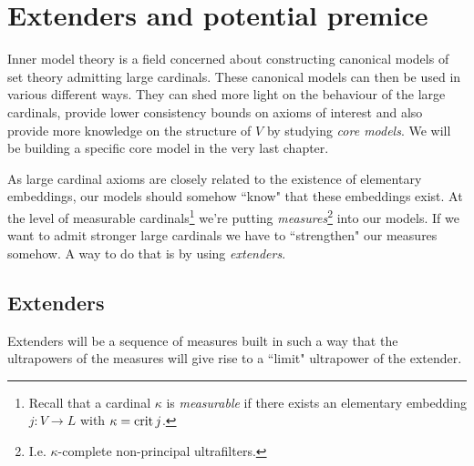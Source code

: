 \chapter{Extenders and potential premice}
\thispagestyle{fancy}
\label{ch1}

Inner model theory is a field concerned about constructing canonical models of set theory admitting large cardinals. These canonical models can then be used in various different ways. They can shed more light on the behaviour of the large cardinals, provide lower consistency bounds on axioms of interest and also provide more knowledge on the structure of $V$ by studying \textit{core models}. We will be building a specific core model in the very last chapter.

\qquad As large cardinal axioms are closely related to the existence of elementary embeddings, our models should somehow ``know" that these embeddings exist. At the level of measurable cardinals\footnote{Recall that a cardinal $\kappa$ is \textit{measurable} if there exists an elementary embedding $j:V\to L$ with $\kappa=\operatorname{crit} j$.} we're putting \textit{measures}\footnote{I.e. $\kappa$-complete non-principal ultrafilters.} into our models. If we want to admit stronger large cardinals we have to ``strengthen" our measures somehow. A way to do that is by using \textit{extenders}.\\

\section{Extenders}
Extenders will be a sequence of measures built in such a way that the ultrapowers of the measures will give rise to a ``limit" ultrapower of the extender.


